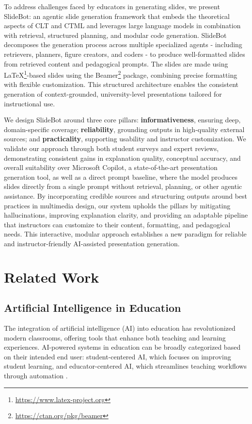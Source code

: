 \documentclass[letterpaper]{article} %
\begin{document}
To address challenges faced by educators in generating slides, we present SlideBot: an agentic slide generation framework that embeds the theoretical aspects of CLT and CTML and leverages large language models in combination with retrieval, structured planning, and modular code generation. SlideBot decomposes the generation process across multiple specialized agents - including retrievers, planners, figure creators, and coders - to produce well-formatted slides from retrieved content and pedagogical prompts. The slides are made using  \LaTeX{}\footnote{\url{https://www.latex-project.org}}-based slides using the Beamer\footnote{\url{https://ctan.org/pkg/beamer}} package, combining precise formatting with flexible customization. This structured architecture enables the consistent generation of context-grounded, university-level presentations tailored for instructional use.

We design SlideBot around three core pillars: \textbf{informativeness}, ensuring deep, domain-specific coverage; \textbf{reliability}, grounding outputs in high-quality external sources; and \textbf{practicality}, supporting usability and instructor customization. We validate our approach through both student surveys and expert reviews, demonstrating consistent gains in explanation quality, conceptual accuracy, and overall suitability over Microsoft Copilot, a state-of-the-art presentation generation tool, as well as a direct prompt baseline, where the model produces slides directly from a single prompt without retrieval, planning, or other agentic assistance. By incorporating credible sources and structuring outputs around best practices in multimedia design, our system upholds the pillars by mitigating hallucinations, improving explanation clarity, and providing an adaptable pipeline that instructors can customize to their content, formatting, and pedagogical needs. This interactive, modular approach establishes a new paradigm for reliable and instructor-friendly AI-assisted presentation generation.


\section{Related Work}

\subsection{Artificial Intelligence in Education}


The integration of artificial intelligence (AI) into education has revolutionized modern classrooms, offering tools that enhance both teaching and learning experiences. AI-powered systems in education can be broadly categorized based on their intended end user: student-centered AI, which focuses on improving student learning, and educator-centered AI, which streamlines teaching workflows through automation \citep{wang2024large}.
\end{document}
